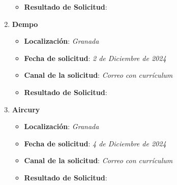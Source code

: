 \begin{enumerate}
\begin{itemize}
		\item \textbf{Resultado de Solicitud}: 
	\end{itemize}
	\item \textbf{Dempo}
	\begin{itemize}
		\item \textbf{Localización}: \textit{Granada}
		\item \textbf{Fecha de solicitud}: \textit{2 de Diciembre de 2024}
		\item \textbf{Canal de la solicitud}: \textit{Correo con currículum}
		\item \textbf{Resultado de Solicitud}: 
	\end{itemize}
		\item \textbf{Aircury}
	\begin{itemize}
		\item \textbf{Localización}: \textit{Granada}
		\item \textbf{Fecha de solicitud}: \textit{4 de Diciembre de 2024}
		\item \textbf{Canal de la solicitud}: \textit{Correo con currículum}
		\item \textbf{Resultado de Solicitud}: 
	\end{itemize}
\end{enumerate}







%

